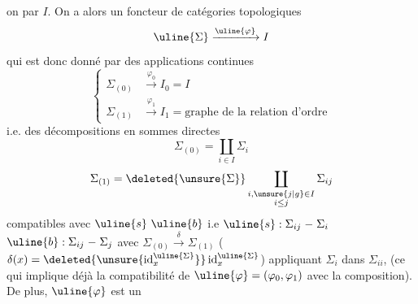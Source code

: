 on  par $I$. On a alors un foncteur
 de catégories topologiques 
\[
\uline{\Sigma}\xrightarrow{\uline{\varphi}}I
\]
qui est donc donné par des applications continues
\[
\left\{\begin{aligned}
\Sigma_{(0)}&\xrightarrow{\varphi_0}I_0=I\\
\Sigma_{(1)}&\xrightarrow{\varphi_1}I_1=\text{graphe de la relation d'ordre}
\end{aligned}\right.
\]
i.e. des décompositions en sommes directes
\[
\Sigma_{(0)}=\coprod_{i\in I}\Sigma_i
\]
\[
\Sigma_{(1)}=\deleted{\unsure{\Sigma}}\coprod_{\substack{i,\unsure{j|g}\in I\\i\leq j}}\Sigma_{ij}
\]
compatibles avec $\uline{s}\ \uline{b}$
i.e $\uline{s}:\Sigma_{ij}\mathrel{-}\Sigma_i$
$\uline{b}:\Sigma_{ij}\mathrel{-}\Sigma_j$
avec $\Sigma_{(0)}\xrightarrow{\delta}\Sigma_{(1)}$ ($\delta(x)=\deleted{\unsure{\operatorname{id}^{\uline{\Sigma}}_x}}\operatorname{id}^{\uline{\Sigma}}_x$)
appliquant $\Sigma_i$ dans $\Sigma_{ii}$,  (ce qui
implique déjà la compatibilité de $\uline{\varphi}=(\varphi_0,\varphi_1)$ avec
la composition). De plus, $\uline{\varphi}$ est un
